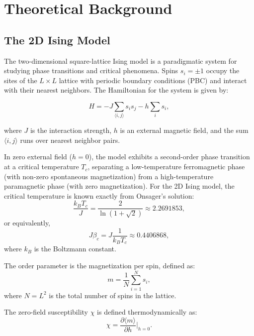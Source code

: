 \section{Theoretical Background}


\subsection{The 2D Ising Model}

The two-dimensional square-lattice Ising model is a paradigmatic system for studying phase transitions and critical phenomena. Spins $s_i = \pm 1$ occupy the sites of the $L \times L$ lattice with periodic boundary conditions (PBC) and interact with their nearest neighbors. The Hamiltonian for the system is given by:

\begin{equation}
H = -J \sum_{\langle i,j \rangle} s_i s_j - h \sum_i s_i,
\end{equation}

where $J$ is the interaction strength, $h$ is an external magnetic field, and the sum $\langle i,j \rangle$ runs over nearest neighbor pairs.

In zero external field ($h = 0$), the model exhibits a second-order phase transition at a critical temperature $T_c$, separating a low-temperature ferromagnetic phase (with non-zero spontaneous magnetization) from a high-temperature paramagnetic phase (with zero magnetization). For the 2D Ising model, the critical temperature is known exactly from Onsager's solution:
\begin{equation}
    \frac{k_B T_c}{J} = \frac{2}{\ln(1 + \sqrt{2})} \approx 2.2691853,
\end{equation}
or equivalently,
\begin{equation}
    J \beta_c = J \frac{1}{k_B T_c} \approx 0.4406868,
\end{equation}
where $k_B$ is the Boltzmann constant. \cite{2DIsingCritTemp}

The order parameter is the magnetization per spin, defined as:
\begin{equation}   
    m = \frac{1}{N} \sum_{i=1}^{N} s_i,
\end{equation}
where $N = L^2$ is the total number of spins in the lattice.

The zero-field susceptibility $\chi$ is defined thermodynamically as:
\begin{equation}
    \chi = \frac{\partial \langle m \rangle}{\partial h} \Big|_{h=0}.
\end{equation}

